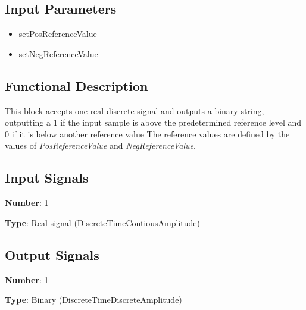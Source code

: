 \documentclass[../../sdf/tex/BPSK_system.tex]{subfiles}
\begin{document}
\onlyinsubfile{\maketitle}

\subsection*{Input Parameters}

\begin{multicols}{2}
	\begin{itemize}
		\item setPosReferenceValue
		\item setNegReferenceValue
	\end{itemize}
\end{multicols}

\subsection*{Functional Description}

This block accepts one real discrete signal and outputs a binary string, outputting a 1 if the input sample is above the predetermined reference level and 0 if it is below another reference value The reference values are defined by the values of \textit{PosReferenceValue} and \textit{NegReferenceValue}.

\subsection*{Input Signals}

\textbf{Number}: 1

\textbf{Type}: Real signal (DiscreteTimeContiousAmplitude)

\subsection*{Output Signals}

\textbf{Number}: 1

\textbf{Type}: Binary (DiscreteTimeDiscreteAmplitude)
\end{document}
